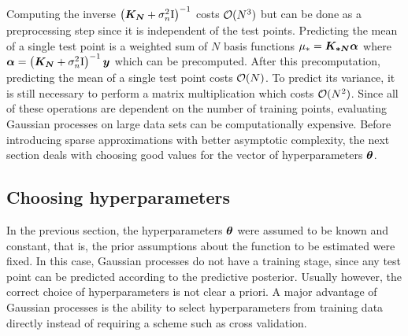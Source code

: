 Computing the inverse $\left(\bm{K_N} + \sigma_n^2 \mathrm{I} \right)^{-1}$ costs $\operatorname{\mathcal{O}}(N^3)$ but can be done as a preprocessing step since it is independent of the test points.
Predicting the mean of a single test point is a weighted sum of $N$ basis functions $\mu_\ast = \bm{K_{\ast N}} \bm{\alpha}$ where $\bm{\alpha} = \left(\bm{K_N} + \sigma_n^2 \mathrm{I} \right)^{-1} \bm{y}$ which can be precomputed.
After this precomputation, predicting the mean of a single test point costs $\operatorname{\mathcal{O}}(N)$.
To predict its variance, it is still necessary to perform a matrix multiplication which costs $\operatorname{\mathcal{O}}(N^2)$.
Since all of these operations are dependent on the number of training points, evaluating Gaussian processes on large data sets can be computationally expensive.
Before introducing sparse approximations with better asymptotic complexity, the next section deals with choosing good values for the vector of hyperparameters $\bm{\theta}$.

\subsection{Choosing hyperparameters}
\label{sub:gp_hyperparameters}
In the previous section, the hyperparameters $\bm{\theta}$ were assumed to be known and constant, that is, the prior assumptions about the function to be estimated were fixed.
In this case, Gaussian processes do not have a training stage, since any test point can be predicted according to the predictive posterior.
Usually however, the correct choice of hyperparameters is not clear a priori.
A major advantage of Gaussian processes is the ability to select hyperparameters from training data directly instead of requiring a scheme such as cross validation.

